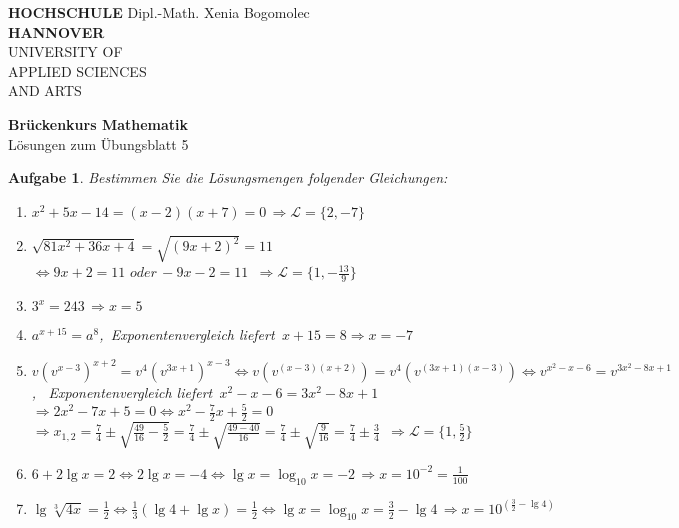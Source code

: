\documentclass[12pt]{article}
\newtheorem{exercise}[satz]{Aufgabe}
\begin{document}
\pagestyle{empty}
\parindent 0cm
\begin{minipage}{14cm}
  \footnotesize{\textbf{HOCHSCHULE} \hfill Dipl.-Math. Xenia Bogomolec\\
  \textbf{HANNOVER}\\
  UNIVERSITY OF\\
  APPLIED SCIENCES\\
  AND ARTS
  }
\end{minipage}
\vspace{1.0cm}

\begin{center}
  {\Large \bf Br\"uckenkurs Mathematik} \\
  \vspace{0.5cm}
  {\large L\"osungen zum \"Ubungsblatt 5}  \\
\end{center}
\vspace{0.5cm}
\normalsize
\parindent0cm

\begin{exercise}
  Bestimmen Sie die L\"osungsmengen folgender Gleichungen:
  \begin{enumerate}
    \item[(a)] $x^2+5x-14=(x-2)(x+7)=0 \,\Rightarrow \mathcal{L} = \{2,-7\}$
    \item[(b)] $\sqrt{81x^2+36x+4}=\sqrt{(9x+2)^2}=11 $\\
         $\Leftrightarrow 9x+2=11 \,\, oder \,-9x-2=11$
         $\,\Rightarrow \mathcal{L} = \{1,-\frac{13}{9}\}$
    \item[(c)] $3^x = 243 \,\Rightarrow x=5$
    \item[(d)] $a^{x+15}=a^8$, \,Exponentenvergleich liefert\, $x+15=8\Rightarrow x=-7$
    \item[(e)] $v(v^{x-3})^{x+2} = v^4(v^{3x+1})^{x-3}\Leftrightarrow
         v(v^{(x-3)(x+2)}) = v^4(v^{(3x+1)(x-3)})\Leftrightarrow
         v^{x^2-x-6}=v^{3x^2-8x+1}$,
        \, Exponentenvergleich liefert\, $x^2-x-6=3x^2-8x+1$ \\
         $\Rightarrow 2x^2-7x+5=0 \Leftrightarrow x^2-\frac{7}{2}x+\frac{5}{2}=0$\\
         $\Rightarrow x_{1,2}=\frac{7}{4}\pm\sqrt{\frac{49}{16}-\frac{5}{2}}=\frac{7}{4}\pm\sqrt{\frac{49-40}{16}}=\frac{7}{4}\pm\sqrt{\frac{9}{16}}=\frac{7}{4}\pm\frac{3}{4}$
         $\,\Rightarrow \mathcal{L} = \{1,\frac{5}{2}\}$
    \item[(f)] $6 + 2\lg{x} = 2 \Leftrightarrow 2\lg{x} = -4 \Leftrightarrow 
        \lg{x}=\log_{10}x = -2 \,\Rightarrow x=10^{-2}=\frac{1}{100}$\\
    \item[(g)] $\lg{\sqrt[3]{4x}} = \frac{1}{2}\Leftrightarrow \frac{1}{3}(\lg{4}+\lg{x})=\frac{1}{2}\Leftrightarrow \lg{x}=\log_{10}x=\frac{3}{2}-\lg{4}\,\Rightarrow x=10^{(\frac{3}{2}-\lg{4})}$
  \end{enumerate}
\end{exercise}
\end{document}
